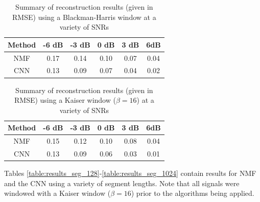 \documentclass[12pt,chapterheads]{ucsd}
\begin{document}
\vspace{0.25in}
\begin{table}[!ht]
\caption{Summary of reconstruction results (given in RMSE) using a Blackman-Harris window at a variety of SNRs}


\vspace{-0.25in}
\begin{center}
\begin{tabular}{| c | c | c |  c | c | c |}

\hline
Method & -6 dB & -3 dB & 0 dB & 3 dB & 6dB \\

\hline
NMF & 0.17 & 0.14 & 0.10 & 0.07 & 0.04 \\

\hline
CNN & 0.13 & 0.09 & 0.07 & 0.04 & 0.02 \\

\hline
\end{tabular}
\end{center}
\label{table:results_win_blackharr}
\end{table}

\vspace{0.25in}
\begin{table}[!ht]
\caption{Summary of reconstruction results (given in RMSE) using a Kaiser window ($\beta=16$) at a variety of SNRs}

\vspace{-0.25in}
\begin{center}
\begin{tabular}{| c | c | c |  c | c | c |}

\hline
Method & -6 dB & -3 dB & 0 dB & 3 dB & 6dB \\

\hline
NMF & 0.15 & 0.12 & 0.10 & 0.08 & 0.04 \\

\hline
CNN & 0.13 & 0.09 & 0.06 & 0.03 & 0.01 \\

\hline
\end{tabular}
\end{center}
\label{table:results_win_kaiser}
\end{table}

Tables \ref{table:results_seg_128}-\ref{table:results_seg_1024} contain results for NMF and the CNN using a variety of segment lengths. Note that all signals were windowed with a Kaiser window ($\beta=16$) prior to the algorithms being applied.
\end{document}
